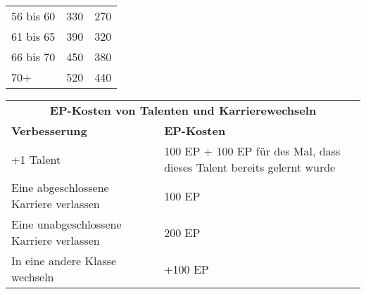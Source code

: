\documentclass[a4paper, fontsize=11pt]{scrartcl}
\begin{document}
\begin{table}[!ht]
\begin{tabularx}{\textwidth}{l|l|l}
        56 bis 60                     & 330                                          & 270                                     \\ \cline{1-3}
        61 bis 65                     & 390                                          & 320                                     \\ \cline{1-3}
        66 bis 70                     & 450                                          & 380                                     \\ \cline{1-3}
        70+                           & 520                                          & 440
    \end{tabularx}
\end{table}

\begin{table}[!ht]
    \centering
    \begin{tabularx}{\textwidth}{l|X}
        \multicolumn{2}{c}{\cellcolor{gray!25} \textbf{EP-Kosten von Talenten und Karrierewechseln}                                                 } \\ \cline{1-2}
        \textbf{Verbesserung}                    & \textbf{EP-Kosten}                                                                                 \\ \cline{1-2}
        +1 Talent                                & 100 EP + 100 EP für des Mal, dass dieses Talent bereits gelernt wurde                              \\ \cline{1-2}
        Eine abgeschlossene Karriere verlassen   & 100 EP                                                                                             \\ \cline{1-2}
        Eine unabgeschlossene Karriere verlassen & 200 EP                                                                                             \\ \cline{1-2}
        In eine andere Klasse wechseln           & +100 EP
    \end{tabularx}
\end{table}
\end{document}
